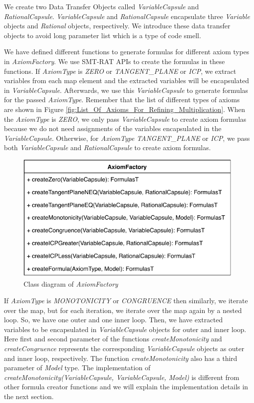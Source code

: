 \noindent We create two Data Transfer Objects called \textit{VariableCapsule} and \textit{RationalCapsule}.
\textit{VariableCapsule} and \textit{RationalCapsule} encapsulate three \textit{Variable} objects and \textit{Rational} objects, respectively.
We introduce these data transfer objects to avoid long parameter list which is a type of code smell.\newline

\noindent We have defined different functions to generate formulas for different axiom types in \textit{AxiomFactory}.
We use SMT-RAT APIs to create the formulas in these functions.
If \textit{AxiomType} is \textit{ZERO} or \textit{TANGENT\_PLANE} or \textit{ICP}, we extract variables from each map element and the extracted variables will be encapsulated in \textit{VariableCapsule}.
Afterwards, we use this \textit{VariableCapsule} to generate formulas for the passed \textit{AxiomType}.
Remember that the list of different types of axioms are shown in Figure \ref{fig:List_Of_Axioms_For_Refining_Multiplication}.
When the \textit{AxiomType} is \textit{ZERO}, we only pass \textit{VariableCapsule} to create axiom formulas because we do not need assignments of the variables encapsulated in the \textit{VariableCapsule}.
Otherwise, for \textit{AxiomType} \textit{TANGENT\_PLANE} or \textit{ICP}, we pass both \textit{VariableCapsule} and \textit{RationalCapsule} to create axiom formulas.\newline

\begin{figure}[ht!]
  \centering
  \includegraphics[width=0.6\linewidth]{./figures/AxiomFactoryClassDiagram.pdf}
  \caption{Class diagram of \textit{AxiomFactory}}
  \label{fig:class_diagram_of_AxiomFactory}
\end{figure}

\noindent If \textit{AxiomType} is \textit{MONOTONICITY} or \textit{CONGRUENCE} then similarly, we iterate over the map, but for each iteration, we iterate over the map again by a nested loop.
So, we have one outer and one inner loop.
Then, we have extracted variables to be encapsulated in \textit{VariableCapsule} objects for outer and inner loop.
Here first and second parameter of the functions \textit{createMonotonicity} and \textit{createCongruence} represents the  corresponding \textit{VariableCapsule} objects as outer and inner loop, respectively.
The function \textit{createMonotonicity} also has a third parameter of \textit{Model} type.
The implementation of \textit{createMonotonicity(VariableCapsule, VariableCapsule, Model)} is different from other formula creator functions and we will explain the implementation details in the next section.

